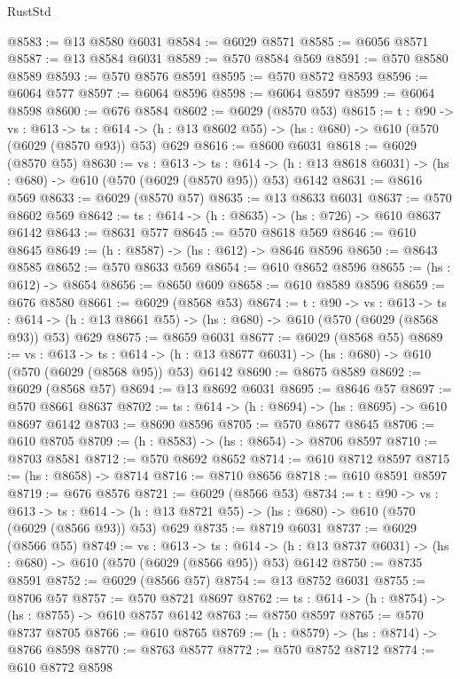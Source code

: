 \begin{lexlean}{RustStd}
\begin{coremodule}
@8583 := @13 @8580 @6031
@8584 := @6029 @8571
@8585 := @6056 @8571
@8587 := @13 @8584 @6031
@8589 := @570 @8584 @569
@8591 := @570 @8580 @8589
@8593 := @570 @8576 @8591
@8595 := @570 @8572 @8593
@8596 := @6064 @577
@8597 := @6064 @8596
@8598 := @6064 @8597
@8599 := @6064 @8598
@8600 := @676 @8584
@8602 := @6029 (@8570 @53)
@8615 := {t : @90} ->
  {vs : @613} ->
  {ts : @614} -> (h : @13 @8602 @55) -> (hs : @680) -> @610 (@570 (@6029 (@8570 @93)) @53) @629
@8616 := @8600 @6031
@8618 := @6029 (@8570 @55)
@8630 := {vs : @613} ->
  {ts : @614} -> (h : @13 @8618 @6031) -> (hs : @680) -> @610 (@570 (@6029 (@8570 @95)) @53) @6142
@8631 := @8616 @569
@8633 := @6029 (@8570 @57)
@8635 := @13 @8633 @6031
@8637 := @570 @8602 @569
@8642 := {ts : @614} -> (h : @8635) -> (hs : @726) -> @610 @8637 @6142
@8643 := @8631 @577
@8645 := @570 @8618 @569
@8646 := @610 @8645
@8649 := (h : @8587) -> (hs : @612) -> @8646 @8596
@8650 := @8643 @8585
@8652 := @570 @8633 @569
@8654 := @610 @8652 @8596
@8655 := (hs : @612) -> @8654
@8656 := @8650 @609
@8658 := @610 @8589 @8596
@8659 := @676 @8580
@8661 := @6029 (@8568 @53)
@8674 := {t : @90} ->
  {vs : @613} ->
  {ts : @614} -> (h : @13 @8661 @55) -> (hs : @680) -> @610 (@570 (@6029 (@8568 @93)) @53) @629
@8675 := @8659 @6031
@8677 := @6029 (@8568 @55)
@8689 := {vs : @613} ->
  {ts : @614} -> (h : @13 @8677 @6031) -> (hs : @680) -> @610 (@570 (@6029 (@8568 @95)) @53) @6142
@8690 := @8675 @8589
@8692 := @6029 (@8568 @57)
@8694 := @13 @8692 @6031
@8695 := @8646 @57
@8697 := @570 @8661 @8637
@8702 := {ts : @614} -> (h : @8694) -> (hs : @8695) -> @610 @8697 @6142
@8703 := @8690 @8596
@8705 := @570 @8677 @8645
@8706 := @610 @8705
@8709 := (h : @8583) -> (hs : @8654) -> @8706 @8597
@8710 := @8703 @8581
@8712 := @570 @8692 @8652
@8714 := @610 @8712 @8597
@8715 := (hs : @8658) -> @8714
@8716 := @8710 @8656
@8718 := @610 @8591 @8597
@8719 := @676 @8576
@8721 := @6029 (@8566 @53)
@8734 := {t : @90} ->
  {vs : @613} ->
  {ts : @614} -> (h : @13 @8721 @55) -> (hs : @680) -> @610 (@570 (@6029 (@8566 @93)) @53) @629
@8735 := @8719 @6031
@8737 := @6029 (@8566 @55)
@8749 := {vs : @613} ->
  {ts : @614} -> (h : @13 @8737 @6031) -> (hs : @680) -> @610 (@570 (@6029 (@8566 @95)) @53) @6142
@8750 := @8735 @8591
@8752 := @6029 (@8566 @57)
@8754 := @13 @8752 @6031
@8755 := @8706 @57
@8757 := @570 @8721 @8697
@8762 := {ts : @614} -> (h : @8754) -> (hs : @8755) -> @610 @8757 @6142
@8763 := @8750 @8597
@8765 := @570 @8737 @8705
@8766 := @610 @8765
@8769 := (h : @8579) -> (hs : @8714) -> @8766 @8598
@8770 := @8763 @8577
@8772 := @570 @8752 @8712
@8774 := @610 @8772 @8598

\end{coremodule}
\end{lexlean}
